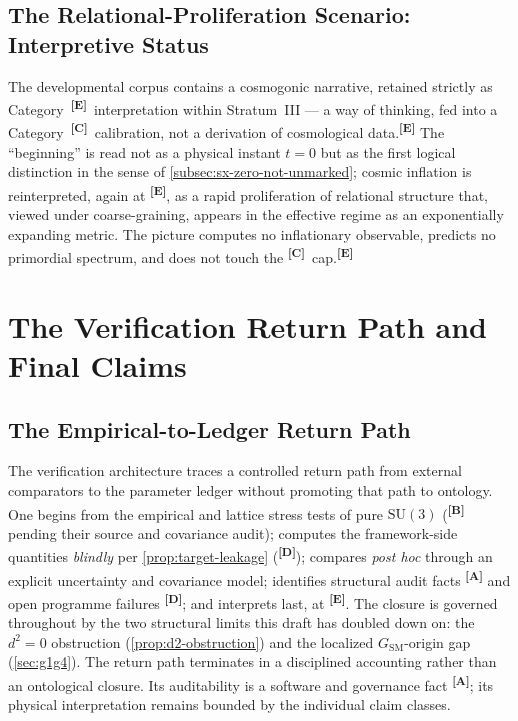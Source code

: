\documentclass[12pt,a4paper,twoside]{article}
\theoremstyle{plain}
\theoremstyle{definition}
\theoremstyle{remark}
\newcommand{\catmark}[1]{\textsuperscript{\textsf{\textbf{[#1]}}}}
\begin{document}
\subsection{The Relational-Proliferation Scenario: Interpretive Status}
\label{subsec:information-big-bang}

The developmental corpus contains a cosmogonic narrative, retained
strictly as Category~\catmark{E}\ interpretation within Stratum~III ---
a way of thinking, fed into a Category~\catmark{C}\ calibration, not a
derivation of cosmological data.\catmark{E} The ``beginning'' is read
not as a physical instant $t=0$ but as the first logical distinction in
the sense of \cref{subsec:sx-zero-not-unmarked}; cosmic inflation is
reinterpreted, again at \catmark{E}, as a rapid proliferation of
relational structure that, viewed under coarse-graining, appears in the
effective regime as an exponentially expanding metric. The picture
computes no inflationary observable, predicts no primordial spectrum,
and does not touch the \catmark{C}\ cap.\catmark{E}

\section{The Verification Return Path and Final Claims}
\label{sec:closed-circle}

\subsection{The Empirical-to-Ledger Return Path}
\label{subsec:return-path}

The verification architecture traces a controlled return path from external
comparators to the parameter ledger without promoting that path to ontology. One begins from the empirical and lattice stress
tests of pure $\mathrm{SU}(3)$ (\catmark{B}\,pending their source and
covariance audit); computes the framework-side quantities \emph{blindly}
per \cref{prop:target-leakage} (\catmark{D}); compares \emph{post hoc}
through an explicit uncertainty and covariance model; identifies structural audit facts \catmark{A} and open programme failures
\catmark{D}; and interprets last, at \catmark{E}. The closure is governed throughout by the two structural
limits this draft has doubled down on: the $d^2=0$ obstruction
(\cref{prop:d2-obstruction}) and the localized
$G_{\mathrm{SM}}$-origin gap (\cref{sec:g1g4}). The return path terminates in a disciplined accounting rather than an
ontological closure. Its auditability is a software and governance fact
\catmark{A}; its physical interpretation remains bounded by the individual
claim classes.
\end{document}
